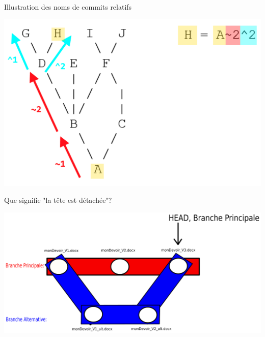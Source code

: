 \documentclass{beamer}
\begin{document}
\begin{frame}{Illustration des noms de commits relatifs}
    \begin{center}
        \includegraphics[scale=0.35]{images/nomCommits/nomCommitRelatif.png}
    \end{center}
\end{frame}

\begin{frame}{Que signifie "la tête est détachée"?}
    \begin{center}
        \includegraphics[scale=0.35]{images/detachedHead/detachedHead0.png}
    \end{center}
\end{frame}
\end{document}
